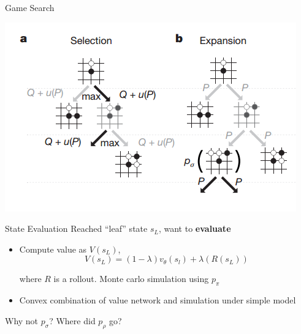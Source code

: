 \documentclass{beamer}
\begin{document}
\begin{frame}{Game Search}
  \begin{center}
    \includegraphics[width=\textwidth]{alphago/montecarlo}
  \end{center}
\end{frame}




\begin{frame}{State Evaluation}
  Reached ``leaf'' state $s_L$, want to \textbf{evaluate}

  \begin{itemize}
  \item Compute value as $V(s_L)$,
    \[ V(s_L) = (1-\lambda) v_\theta(s_l) + \lambda (R(s_L))\] 
   
    where $R$ is a rollout. Monte carlo simulation using $p_{\pi}$ 
    \air 
  \item Convex combination of value network and simulation under simple model
  \end{itemize}
  \air 

  Why not $p_{\sigma}$? Where did $p_{\rho}$ go?
\end{frame}
\end{document}
